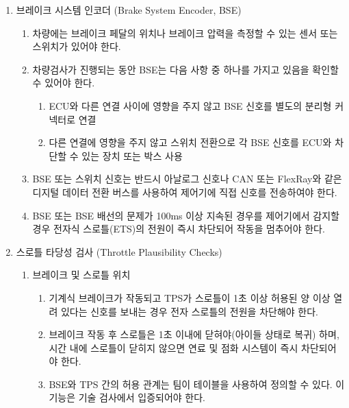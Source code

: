 \documentclass[final,a4paper,10pt]{report}
\begin{document}
\begin{enumerate}
  \item 브레이크 시스템 인코더 (Brake System Encoder, BSE)
    \begin{enumerate}
      \item 차량에는 브레이크 페달의 위치나 브레이크 압력을 측정할 수 있는 센서 또는 스위치가 있어야 한다.
      
      \item 차량검사가 진행되는 동안 BSE는 다음 사항 중 하나를 가지고 있음을 확인할 수 있어야 한다.
        \begin{enumerate}
          \item ECU와 다른 연결 사이에 영향을 주지 않고 BSE 신호를 별도의 분리형 커넥터로 연결
          \item 다른 연결에 영향을 주지 않고 스위치 전환으로 각 BSE 신호를 ECU와 차단할 수 있는 장치 또는 박스 사용
        \end{enumerate}
        
      \item BSE 또는 스위치 신호는 반드시 아날로그 신호나 CAN 또는 FlexRay와 같은 디지털 데이터 전환 버스를 사용하여 제어기에 직접 신호를 전송하여야 한다.
      \item BSE 또는 BSE 배선의 문제가 100ms 이상 지속된 경우를 제어기에서 감지할 경우 전자식 스로틀(ETS)의 전원이 즉시 차단되어 작동을 멈추어야 한다.
    \end{enumerate}
    
  \item 스로틀 타당성 검사 (Throttle Plausibility Checks) \label{item:스로틀 타당성 검사}
    \begin{enumerate}
      \item 브레이크 및 스로틀 위치
        \begin{enumerate}
          \item 기계식 브레이크가 작동되고 TPS가 스로틀이 1초 이상 허용된 양 이상 열려 있다는 신호를 보내는 경우 전자 스로틀의 전원을 차단해야 한다.
          \item 브레이크 작동 후 스로틀은 1초 이내에 닫혀야(아이들 상태로 복귀) 하며, 시간 내에 스로틀이 닫히지 않으면 연료 및 점화 시스템이 즉시 차단되어야 한다.
          \item BSE와 TPS 간의 허용 관계는 팀이 테이블을 사용하여 정의할 수 있다. 이 기능은 기술 검사에서 입증되어야 한다.
        \end{enumerate}
        

\end{enumerate}
\end{enumerate}
\end{document}
